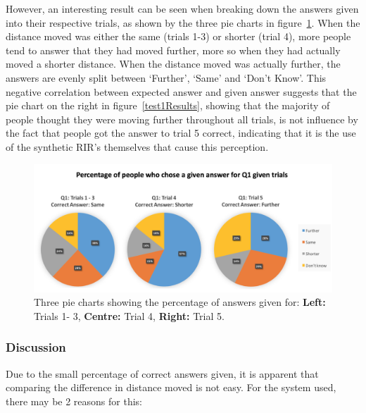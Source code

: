\documentclass[../../main.tex]{subfiles}
\begin{document}
			However, an interesting result can be seen when breaking down the answers given into their respective trials, as shown by the three pie charts in figure~\ref{Q1Trials}. When the distance moved was either the same (trials 1-3) or shorter (trial 4), more people tend to answer that they had moved further, more so when they had actually moved a shorter distance. When the distance moved was actually further, the answers are evenly split between `Further', `Same' and `Don't Know'. This negative correlation between expected answer and given answer suggests that the pie chart on the right in figure~\ref{test1Results}, showing that the majority of people thought they were moving further throughout all trials, is not influence by the fact that people got the answer to trial 5 correct, indicating that it is the use of the synthetic \ac{RIR}'s themselves that cause this perception.


			\begin{figure}[h]
				\centerline{\includegraphics[width=\textwidth]{Sections/userTesting/images/test1/Q1Trials.png}}
				\caption{Three pie charts showing the percentage of answers given for: \textbf{Left:} Trials 1- 3, \textbf{Centre:} Trial 4, \textbf{Right:} Trial 5.}
				\label{Q1Trials}
			\end{figure}

		\subsubsection{Discussion}


			Due to the small percentage of correct answers given, it is apparent that comparing the difference in distance moved is not easy. For the system used, there may be 2 reasons for this:
\end{document}
